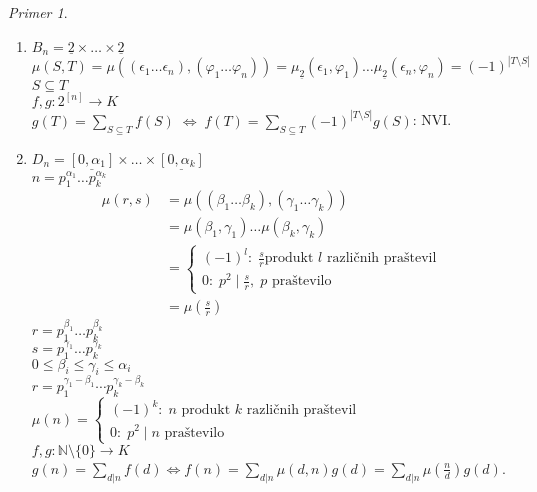 \documentclass[a4paper, 12pt]{book}
\theoremstyle{definition}
\theoremstyle{remark}
\newtheorem*{ex}{Primer}
\newcommand{\N}{\mathbb{N}}
\begin{document}
\begin{ex} \text{}
  \begin{enumerate}[label=(\arabic*)]
    \item $B_n = \underline{2} \times \dots \times \underline{2}$ \\
      $\mu(S, T) = \mu((\epsilon_1 \dots \epsilon_n), (\varphi_1 \dots \varphi_n))
        = \mu_{\underline{2}}(\epsilon_1, \varphi_1) \dots \mu_{\underline{2}}(\epsilon_n, \varphi_n)
        = (-1)^{|T \setminus S|}$ \\
      $S \subseteq T$ \\
      $f, g: 2^{[n]} \to K$ \\
      $g(T) = \sum_{S \subseteq T} f(S) \; \iff \;
      f(T) = \sum_{S \subseteq T} (-1)^{|T \setminus S|} g(S)$: NVI.
    \item $D_n = \underline{[0, \alpha_1]} \times \dots \times \underline{[0, \alpha_k]}$ \\
      $n = p_1^{\alpha_1} \dots p_k^{\alpha_k}$
      \begin{align*}
        \mu(r,s) &= \mu((\beta_1 \dots \beta_k), (\gamma_1 \dots \gamma_k)) \\
        &= \mu(\beta_1, \gamma_1) \dots \mu(\beta_k, \gamma_k) \\
        &= \begin{cases}
          (-1)^l: \; \frac{s}{r} \text{produkt $l$ različnih praštevil} \\
          0: \; p^2 \mid \frac{s}{r}, \; p \text{ praštevilo}
        \end{cases} \\
        &= \mu\left(\frac{s}{r}\right)
      \end{align*}
      $r = p_1^{\beta_1} \dots p_k^{\beta_k}$ \\
      $s = p_1^{\gamma_1} \dots p_k^{\gamma_k}$ \\
      $0 \leq \beta_i \leq \gamma_i \leq \alpha_i$ \\
      $r = p_1^{\gamma_1 - \beta_1} \cdots p_k^{\gamma_k - \beta_k}$ \\
      $\mu(n) = \begin{cases}
        (-1)^k: \; n \text{ produkt $k$ različnih praštevil} \\
        0: \; p^2 \mid n \text{ praštevilo}
      \end{cases}$ \\
      $f, g: \N \setminus \{0\} \to K$ \\
      $g(n) = \sum_{d | n} f(d) \iff
      f(n) = \sum_{d | n} \mu(d,n) g(d) = \sum_{d | n} \mu\left(\frac{n}{d}\right) g(d)$.
  \end{enumerate}
\end{ex}
\end{document}
